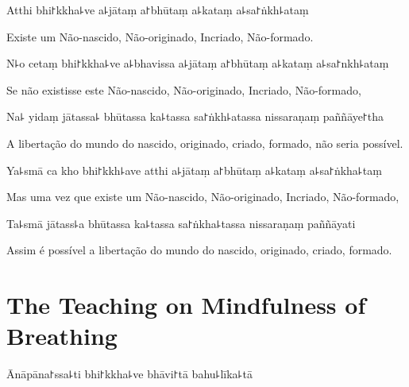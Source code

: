 
\begin{leader}
\end{leader}

Atthi bhi꜓kkha꜕ve a꜕jātaṃ a꜓bhūtaṃ a꜕kataṃ a꜕sa꜓ṅkh꜕ataṃ

\begin{english}
  Existe um Não-nascido, Não-originado, Incriado, Não-formado.
\end{english}

N꜕o cetaṃ bhi꜓kkha꜕ve a꜕bhavissa a꜕jātaṃ a꜓bhūtaṃ a꜕kataṃ a꜕sa꜓nkh꜕ataṃ

\begin{english}
 Se não existisse este Não-nascido, Não-originado, Incriado, Não-formado,
\end{english}

Na꜕ yidaṃ jātassa꜕ bhūtassa ka꜕tassa sa꜓ṅkh꜕atassa nissaraṇaṃ paññāye꜓tha

\begin{english}
  A libertação do mundo do nascido, originado, criado, formado, não seria possível.
\end{english}

Ya꜕smā ca kho bhi꜓kkh꜕ave atthi a꜕jātaṃ a꜓bhūtaṃ a꜕kataṃ a꜕sa꜓ṅkha꜕taṃ

\begin{english}
  Mas uma vez que existe um Não-nascido, Não-originado, Incriado, Não-formado,
\end{english}

Ta꜕smā jātass꜕a bhūtassa ka꜕tassa sa꜓ṅkha꜕tassa nissaraṇaṃ paññāyati

\begin{english}
  Assim é possível a libertação do mundo do nascido, originado, criado, formado.
\end{english}

\chapter{The Teaching on Mindfulness of Breathing}


\begin{leader}
\end{leader}

Ānāpāna꜓ssa꜕ti bhi꜓kkha꜕ve bhāvi꜓tā bahu꜕līka꜕tā

